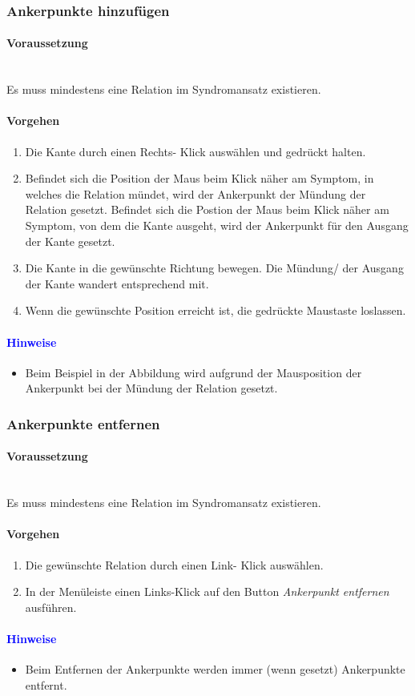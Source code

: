 \documentclass[enabledeprecatedfontcommands,fontsize=11pt,paper=a4,twoside]{scrartcl}
\newcommand*{\hint}{\paragraph{\textcolor{blue}{Hinweise}}}
\newcommand*{\condition}{\paragraph{Voraussetzung}$\;$ \vspace{0.2cm}\\}
\newcommand*{\action}{\paragraph{Vorgehen}}
\begin{document}
		\subsubsection{Ankerpunkte hinzufügen}
		\condition
		Es muss mindestens eine Relation im Syndromansatz existieren.
		\action
		\begin{enumerate}
			\item Die Kante durch einen Rechts- Klick auswählen und gedrückt halten.
			\item Befindet sich die Position der Maus beim Klick näher am Symptom, in welches die Relation mündet, wird der Ankerpunkt der Mündung der Relation gesetzt. Befindet sich die Postion der Maus beim Klick näher am Symptom, von dem die Kante ausgeht, wird der Ankerpunkt für den Ausgang der Kante gesetzt. 
			\item Die Kante in die gewünschte Richtung bewegen. Die Mündung/ der Ausgang der Kante wandert entsprechend mit. 
			\item Wenn die gewünschte Position erreicht ist, die gedrückte Maustaste loslassen. 
		\end{enumerate}
		\begin{figure}[ht!]
			\centering
		\end{figure}
		\hint
		\begin{itemize}
			\item Beim Beispiel in der Abbildung wird aufgrund der Mausposition der Ankerpunkt bei der Mündung der Relation gesetzt.
		\end{itemize}
		
		\subsubsection{Ankerpunkte entfernen}
		\condition
		Es muss mindestens eine Relation im Syndromansatz existieren.
		\action
		\begin{enumerate}
			\item Die gewünschte Relation durch einen Link- Klick auswählen. 
			\item In der Menüleiste einen Links-Klick auf den Button \textit{Ankerpunkt entfernen} ausführen.
		\end{enumerate}
		\hint
		\begin{itemize}
			\item Beim Entfernen der Ankerpunkte werden immer (wenn gesetzt) Ankerpunkte entfernt.\\
		\end{itemize}
		
\end{document}
